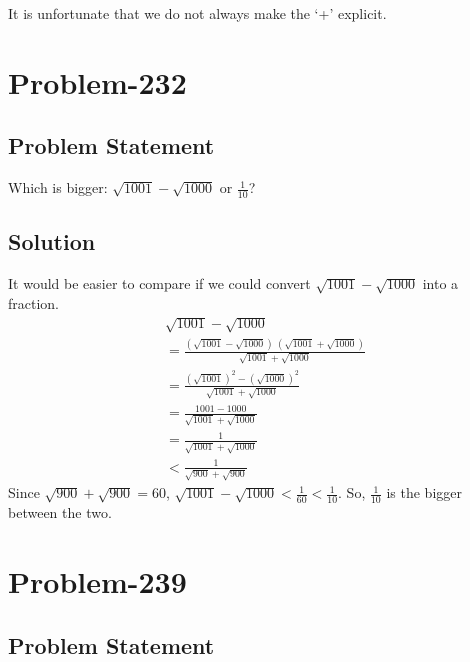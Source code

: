 \documentclass[12pt]{article}
\begin{document}
It is unfortunate that we do not always make the `+' explicit.

\section*{Problem-232}
\subsection*{Problem Statement}
Which is bigger: $\sqrt{1001} - \sqrt{1000}$ or $\frac{1}{10}$?
\subsection*{Solution}
It would be easier to compare if we could convert $\sqrt{1001} - \sqrt{1000}$ into a fraction.
\begin{equation*}
	\begin{aligned}
		& \sqrt{1001} - \sqrt{1000}\\
		&= \frac{ \left(\sqrt{1001} - \sqrt{1000}\right)\ \left(\sqrt{1001} + \sqrt{1000}\right) }{ \sqrt{1001} + \sqrt{1000} }\\
		&= \frac{ \left( \sqrt{1001} \right)^2 - \left( \sqrt{1000} \right)^2 }{ \sqrt{1001} + \sqrt{1000} }\\
		&= \frac{1001 - 1000}{ \sqrt{1001} + \sqrt{1000} }\\
		&= \frac{1}{ \sqrt{1001} + \sqrt{1000} }\\
		&< \frac{1}{ \sqrt{900} + \sqrt{900} }
	\end{aligned}
\end{equation*}
Since $\sqrt{900} + \sqrt{900} = 60$, $\sqrt{1001} - \sqrt{1000} < \frac{1}{60} < \frac{1}{10}$. So, $\frac{1}{10}$ is the bigger between the two.

\section*{Problem-239}
\subsection*{Problem Statement}
\end{document}
